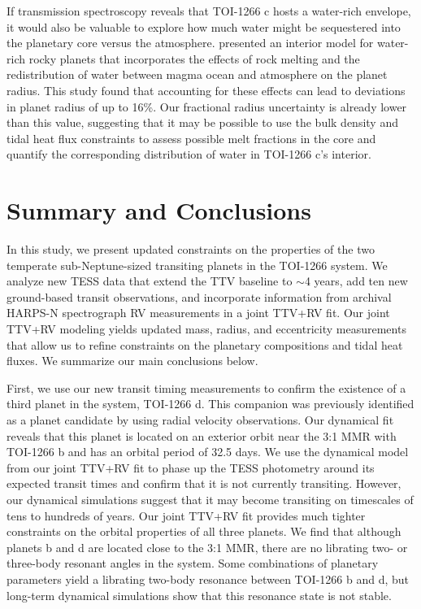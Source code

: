 \documentclass[twocolumn]{aastex631}
\begin{document}
If transmission spectroscopy reveals that TOI-1266 c hosts a water-rich envelope, it would also be valuable to explore how much water might be sequestered into the planetary core versus the atmosphere. \cite{Dorn2021} presented an interior model for water-rich rocky planets that incorporates the effects of rock melting and the redistribution of water between magma ocean and atmosphere on the planet radius. This study found that accounting for these effects can lead to deviations in planet radius of up to 16\%. Our fractional radius uncertainty is already lower than this value, suggesting that it may be possible to use the bulk density and tidal heat flux constraints to assess possible melt fractions in the core and quantify the corresponding distribution of water in TOI-1266 c's interior. 

\section{Summary and Conclusions} \label{sec:summary}

In this study, we present updated constraints on the properties of the two temperate sub-Neptune-sized transiting planets in the TOI-1266 system. We analyze new TESS data that extend the TTV baseline to $\sim$4 years, add ten new ground-based transit observations, and incorporate information from archival HARPS-N spectrograph RV measurements in a joint TTV+RV fit. Our joint TTV+RV modeling yields updated mass, radius, and eccentricity measurements that allow us to refine constraints on the planetary compositions and tidal heat fluxes. We summarize our main conclusions below.

First, we use our new transit timing measurements to confirm the existence of a third planet in the system, TOI-1266 d. This companion was previously identified as a planet candidate by \cite{Cloutier_2024} using radial velocity observations. Our dynamical fit reveals that this planet is located on an exterior orbit near the 3:1 MMR with TOI-1266 b and has an orbital period of 32.5 days.
We use the dynamical model from our joint TTV+RV fit to phase up the TESS photometry around its expected transit times and confirm that it is not currently transiting.  However, our dynamical simulations suggest that it may become transiting on timescales of tens to hundreds of years. Our joint TTV+RV fit provides much tighter constraints on the orbital properties of all three planets. We find that although planets b and d are located close to the 3:1 MMR, there are no librating two- or three-body resonant angles in the system. Some combinations of planetary parameters yield a librating two-body resonance between TOI-1266 b and d, but long-term dynamical simulations show that this resonance state is not stable.
\end{document}
